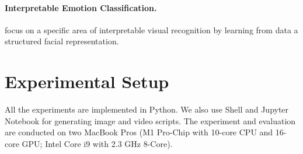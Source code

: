 \paragraph{Interpretable Emotion Classification.}

\citet{YinTLS019} focus on a specific area of interpretable visual recognition by learning from data a structured facial representation. 
\citet{Malik0R21} 

\section{Experimental Setup}
\label{sec:setup}

All the experiments are implemented in Python. 
We also use Shell and Jupyter Notebook for generating image and video scripts. 
The experiment and evaluation are conducted on two MacBook Pros 
(M1 Pro-Chip with 10-core CPU and 16-core GPU; Intel Core i9 with 2.3 GHz 8-Core). 

